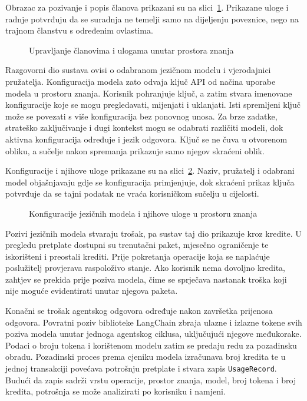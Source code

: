Obrazac za pozivanje i popis članova prikazani su na slici~\ref{fig:clanovi-prostora}. Prikazane uloge i radnje potvrđuju da se suradnja ne temelji samo na dijeljenju poveznice, nego na trajnom članstvu s određenim ovlastima.

\begin{figure}[H]
    \centering
    \caption{Upravljanje članovima i ulogama unutar prostora znanja}
    \label{fig:clanovi-prostora}
\end{figure}

Razgovorni dio sustava ovisi o odabranom jezičnom modelu i vjerodajnici pružatelja. Konfiguracija modela zato odvaja ključ API od načina uporabe modela u prostoru znanja. Korisnik pohranjuje ključ, a zatim stvara imenovane konfiguracije koje se mogu pregledavati, mijenjati i uklanjati. Isti spremljeni ključ može se povezati s više konfiguracija bez ponovnog unosa. Za brze zadatke, strateško zaključivanje i dugi kontekst mogu se odabrati različiti modeli, dok aktivna konfiguracija određuje i jezik odgovora. Ključ se ne čuva u otvorenom obliku, a sučelje nakon spremanja prikazuje samo njegov skraćeni oblik.

Konfiguracije i njihove uloge prikazane su na slici~\ref{fig:konfiguracije-modela}. Naziv, pružatelj i odabrani model objašnjavaju gdje se konfiguracija primjenjuje, dok skraćeni prikaz ključa potvrđuje da se tajni podatak ne vraća korisničkom sučelju u cijelosti.

\begin{figure}[H]
    \centering
    \caption{Konfiguracije jezičnih modela i njihove uloge u prostoru znanja}
    \label{fig:konfiguracije-modela}
\end{figure}

Pozivi jezičnih modela stvaraju trošak, pa sustav taj dio prikazuje kroz kredite. U pregledu pretplate dostupni su trenutačni paket, mjesečno ograničenje te iskorišteni i preostali krediti. Prije pokretanja operacije koja se naplaćuje poslužitelj provjerava raspoloživo stanje. Ako korisnik nema dovoljno kredita, zahtjev se prekida prije poziva modela, čime se sprječava nastanak troška koji nije moguće evidentirati unutar njegova paketa.

Konačni se trošak agentskog odgovora određuje nakon završetka prijenosa odgovora. Povratni poziv biblioteke LangChain zbraja ulazne i izlazne tokene svih poziva modela unutar jednoga agentskog ciklusa, uključujući njegove međukorake. Podaci o broju tokena i korištenom modelu zatim se predaju redu za pozadinsku obradu. Pozadinski proces prema cjeniku modela izračunava broj kredita te u jednoj transakciji povećava potrošnju pretplate i stvara zapis \texttt{UsageRecord}. Budući da zapis sadrži vrstu operacije, prostor znanja, model, broj tokena i broj kredita, potrošnja se može analizirati po korisniku i namjeni.

